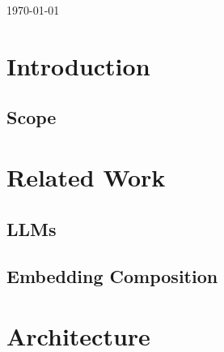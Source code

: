 \documentclass[a4paper, 12pt]{article}
\begin{document}
\begin{titlepage}

{\large \today}\\[1cm] %


 

\vfill %

\end{titlepage}

\tableofcontents
\newpage


\section{Introduction}

\subsection{Scope}

\section{Related Work}

\subsection{LLMs}

\subsection{Embedding Composition}

\section{Architecture}
\end{document}
